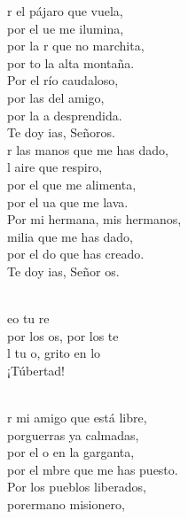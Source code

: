 \documentclass[12pt]{article}
\begin{document}
\begin{multicols*}{2}
\begin{cancion}%
	r el pájaro que vuela, \\
	por el ue me ilumina,\\
	por la r que no marchita, \\
	por to la alta montaña.\\
Por el río caudaloso, \\
	por las  del amigo,\\
	por la a desprendida.\\
	Te doy ias, Señoros.\\
\jump
	r las manos que me has dado,\\
	l aire que respiro,\\
	por el  que me alimenta, \\
	por el ua que me lava.\\
Por mi hermana, mis hermanos, \\
	milia que me has dado, \\
	por el do que has creado. \\
	Te doy ias, Señor os.\\\jump\\
	\begin{chorus}%
	eo tu re\\
	por los os, por los te  \\
	l tu o, grito en lo \\
	¡Túbertad! \\
	\end{chorus}%
	\jump\\
	r mi amigo que está libre, \\
	porguerras ya calmadas, \\
	por el o en la garganta, \\
	por el mbre que me has puesto. \\
Por los pueblos liberados, \\
	porermano misionero, \\

\end{cancion}
\end{multicols*}
\end{document}
